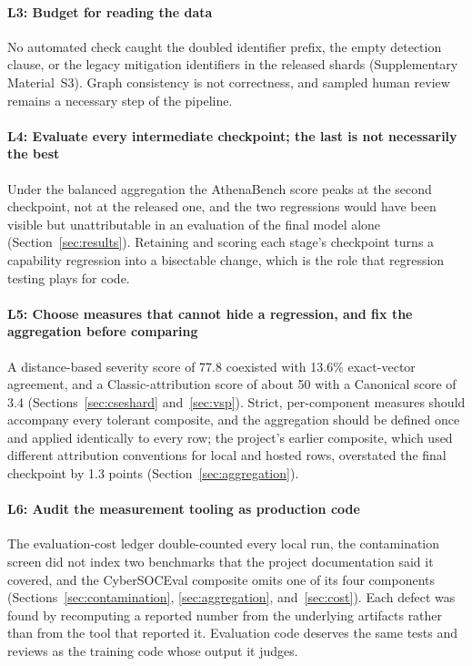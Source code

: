 \documentclass[a4paper,fleqn]{cas-dc}
\begin{document}
\paragraph{L3: Budget for reading the data}
No automated check caught the doubled identifier prefix, the empty detection clause, or the legacy mitigation identifiers in the released shards (Supplementary Material~S3). Graph consistency is not correctness, and sampled human review remains a necessary step of the pipeline.

\paragraph{L4: Evaluate every intermediate checkpoint; the last is not necessarily the best}
Under the balanced aggregation the AthenaBench score peaks at the second checkpoint, not at the released one, and the two regressions would have been visible but unattributable in an evaluation of the final model alone (Section~\ref{sec:results}). Retaining and scoring each stage's checkpoint turns a capability regression into a bisectable change, which is the role that regression testing plays for code.

\paragraph{L5: Choose measures that cannot hide a regression, and fix the aggregation before comparing}
A distance-based severity score of 77.8 coexisted with 13.6\% exact-vector agreement, and a Classic-attribution score of about 50 with a Canonical score of 3.4 (Sections~\ref{sec:cseshard} and~\ref{sec:vsp}). Strict, per-component measures should accompany every tolerant composite, and the aggregation should be defined once and applied identically to every row; the project's earlier composite, which used different attribution conventions for local and hosted rows, overstated the final checkpoint by 1.3 points (Section~\ref{sec:aggregation}).

\paragraph{L6: Audit the measurement tooling as production code}
The evaluation-cost ledger double-counted every local run, the contamination screen did not index two benchmarks that the project documentation said it covered, and the CyberSOCEval composite omits one of its four components (Sections~\ref{sec:contamination}, \ref{sec:aggregation}, and~\ref{sec:cost}). Each defect was found by recomputing a reported number from the underlying artifacts rather than from the tool that reported it. Evaluation code deserves the same tests and reviews as the training code whose output it judges.
\end{document}
